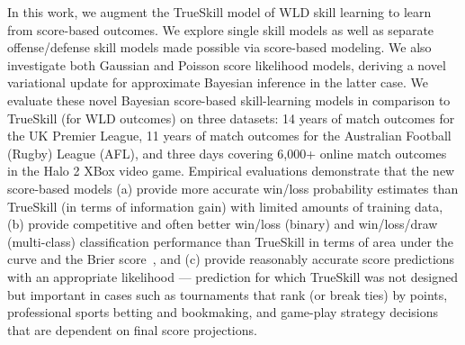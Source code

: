 In this work, we augment the TrueSkill model of WLD skill learning to
learn from score-based outcomes.  We explore single skill models as
well as separate offense/defense skill models made possible via
score-based modeling. We also investigate both Gaussian and Poisson
score likelihood models, deriving a novel variational update for
approximate Bayesian inference in the latter case.  We evaluate these
novel Bayesian score-based skill-learning models in comparison to
TrueSkill (for WLD outcomes) on three datasets: 14 years of match
outcomes for the UK Premier League, 11 years of match outcomes for the
Australian Football (Rugby) League (AFL), and three days covering
6,000+ online match outcomes in the Halo 2 XBox video game.  Empirical
evaluations demonstrate that the new score-based models (a) provide
more accurate win/loss probability estimates than TrueSkill (in terms
of information gain) with limited amounts of training data, (b)
provide competitive and often better win/loss (binary) and win/loss/draw (multi-class) classification
performance than TrueSkill in terms of area under the curve and the Brier score~\cite{Brier:BrierScore}, and (c)
provide reasonably accurate score predictions with an appropriate
likelihood --- prediction for which TrueSkill was not designed but
important in cases such as tournaments that rank (or break ties) by
points, professional sports betting and bookmaking, and game-play
strategy decisions that are dependent on final score projections.